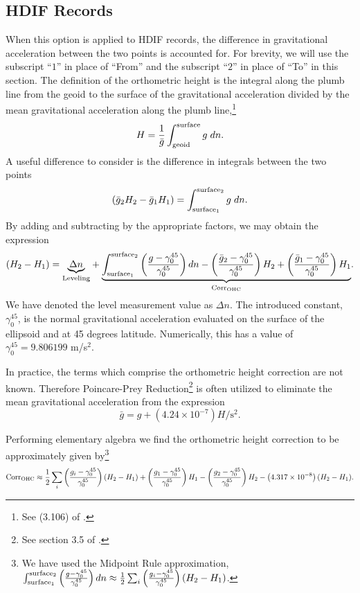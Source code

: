 \subsection{HDIF Records}
When this option is applied to HDIF records, the difference in gravitational acceleration between the two points is accounted for.  For brevity, we will use the subscript ``$1$'' in place of ``From'' and the subscript ``$2$'' in place of ``To'' in this section.  The definition of the orthometric height is the integral along the plumb line from the geoid to the surface of the gravitational acceleration divided by the mean gravitational acceleration along the plumb line,\footnote{See (3.106) of \cite{torge}.}
\begin{equation}
H=\frac{1}{\bar{g}}\int_{\text{geoid}}^{\text{surface}}g\hspace*{1mm} dn.
\end{equation}
A useful difference to consider is the difference in integrals between the two points
\begin{equation}
\left(\bar{g}_2H_2-\bar{g}_1H_1\right)=\int_{\text{surface}_1}^{\text{surface}_2}g\hspace*{1mm} dn.
\end{equation}
By adding and subtracting by the appropriate factors, we may obtain the expression
\begin{equation}
(H_2-H_1)={\underbrace{\Delta n}_{\text{Leveling}}}+{\underbrace{\int_{\text{surface}_1}^{\text{surface}_2}\left(\frac{g-\gamma_0^{45}}{\gamma_0^{45}}\right)dn-\left(\frac{\bar{g}_2-\gamma_0^{45}}{\gamma_0^{45}}\right)H_2+\left(\frac{\bar{g}_1-\gamma_0^{45}}{\gamma_0^{45}}\right)H_1}_{\text{Corr}_{\text{OHC}}}}.
\end{equation}
We have denoted the level measurement value as $\Delta n$.  The introduced constant, $\gamma_0^{45}$, is the normal gravitational acceleration evaluated on the surface of the ellipsoid and at 45 degrees latitude.  Numerically, this has a value of $\gamma_0^{45}=9.806199$ m/s$^2$.

In practice, the terms which comprise the orthometric height correction are not known.  Therefore Poincare-Prey Reduction\footnote{See section 3.5 of \cite{wellenhof}.} is often utilized to eliminate the mean gravitational acceleration from the expression
\begin{equation}
\bar{g}=g+\left(4.24\times10^{-7}\right)H/\text{s}^2.
\end{equation}

Performing elementary algebra we find the orthometric height correction to be approximately given by\footnote{We have used the Midpoint Rule approximation, $\int_{\text{surface}_1}^{\text{surface}_2}\left(\frac{g-\gamma_0^{45}}{\gamma_0^{45}}\right)dn\approx\frac{1}{2}\sum_i\left(\frac{g_i-\gamma_0^{45}}{\gamma_0^{45}}\right)\left(H_2-H_1\right)$.}
\begin{equation}
\text{Corr}_{\text{OHC}}\approx\frac{1}{2}\sum_i\left(\frac{g_i-\gamma_0^{45}}{\gamma_0^{45}}\right)\left(H_2-H_1\right)+\left(\frac{g_1-\gamma_0^{45}}{\gamma_0^{45}}\right)H_1-\left(\frac{g_2-\gamma_0^{45}}{\gamma_0^{45}}\right)H_2-\left(4.317\times10^{-8}\right)(H_2-H_1).
\end{equation}

